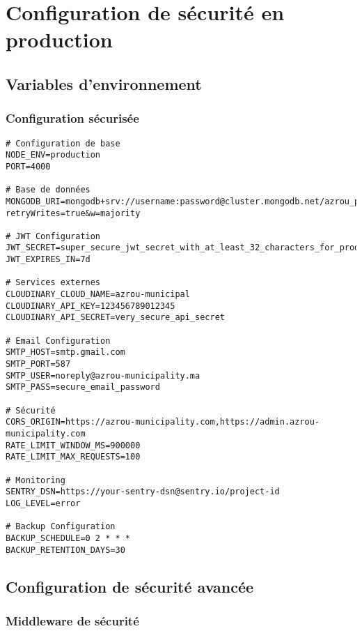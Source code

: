 \section{Configuration de sécurité en production}

\subsection{Variables d'environnement}

\subsubsection{Configuration sécurisée}

\begin{lstlisting}[caption=.env.production]
# Configuration de base
NODE_ENV=production
PORT=4000

# Base de données
MONGODB_URI=mongodb+srv://username:password@cluster.mongodb.net/azrou_production?retryWrites=true&w=majority

# JWT Configuration
JWT_SECRET=super_secure_jwt_secret_with_at_least_32_characters_for_production
JWT_EXPIRES_IN=7d

# Services externes
CLOUDINARY_CLOUD_NAME=azrou-municipal
CLOUDINARY_API_KEY=123456789012345
CLOUDINARY_API_SECRET=very_secure_api_secret

# Email Configuration
SMTP_HOST=smtp.gmail.com
SMTP_PORT=587
SMTP_USER=noreply@azrou-municipality.ma
SMTP_PASS=secure_email_password

# Sécurité
CORS_ORIGIN=https://azrou-municipality.com,https://admin.azrou-municipality.com
RATE_LIMIT_WINDOW_MS=900000
RATE_LIMIT_MAX_REQUESTS=100

# Monitoring
SENTRY_DSN=https://your-sentry-dsn@sentry.io/project-id
LOG_LEVEL=error

# Backup Configuration
BACKUP_SCHEDULE=0 2 * * *
BACKUP_RETENTION_DAYS=30
\end{lstlisting}

\subsection{Configuration de sécurité avancée}

\subsubsection{Middleware de sécurité}

